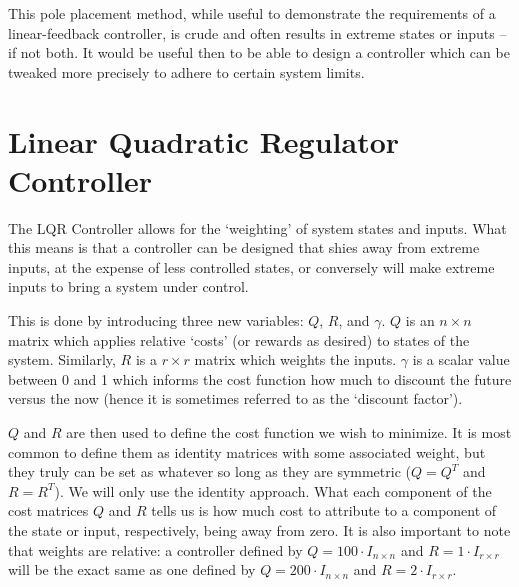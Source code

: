 This pole placement method, while useful to demonstrate the requirements of a linear-feedback controller, is crude and often results in extreme states or inputs -- if not both. It would be useful then to be able to design a controller which can be tweaked more precisely to adhere to certain system limits.

\FloatBarrier\section{Linear Quadratic Regulator Controller} %
The \ac{LQR} Controller allows for the `weighting' of system states and inputs. What this means is that a controller can be designed that shies away from extreme inputs, at the expense of less controlled states, or conversely will make extreme inputs to bring a system under control.

This is done by introducing three new variables: $Q$, $R$, and $\gamma$. $Q$ is an $n\times n$ matrix which applies relative `costs' (or rewards as desired) to states of the system. Similarly, $R$ is a $r\times r$ matrix which weights the inputs. $\gamma$ is a scalar value between 0 and 1 which informs the cost function how much to discount the future versus the now (hence it is sometimes referred to as the `discount factor'). 

$Q$ and $R$ are then used to define the cost function we wish to minimize. It is most common to define them as identity matrices with some associated weight, but they truly can be set as whatever so long as they are symmetric ($Q=Q^T$ and $R=R^T$). We will only use the identity approach. What each component of the cost matrices $Q$ and $R$ tells us is how much cost to attribute to a component of the state or input, respectively, being away from zero. It is also important to note that weights are relative: a controller defined by $Q=100\cdot I_{n\times n}$ and $R=1\cdot I_{r\times r}$ will be the exact same as one defined by $Q=200\cdot I_{n\times n}$ and $R=2\cdot I_{r\times r}$.


